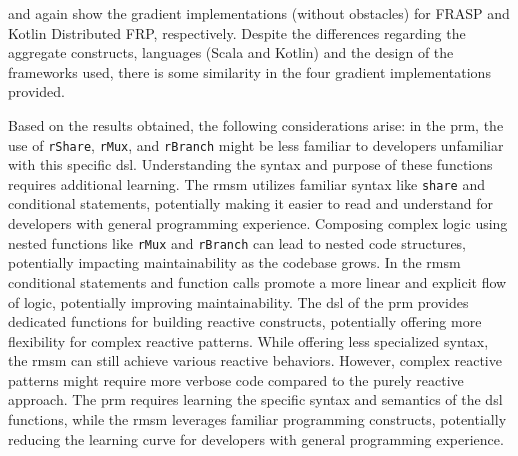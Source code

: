  and  again show the gradient implementations (without obstacles) for FRASP and Kotlin Distributed FRP, respectively. Despite the differences regarding the aggregate constructs, languages (Scala and Kotlin) and the design of the frameworks used, there is some similarity in the four gradient implementations provided.





Based on the results obtained, the following considerations arise:
in the \ac{prm}, the use of \texttt{rShare}, \texttt{rMux}, and \texttt{rBranch} might be less familiar to developers unfamiliar with this specific \ac{dsl}. Understanding the syntax and purpose of these functions requires additional learning. The \ac{rmsm} utilizes familiar syntax like \texttt{share} and conditional statements, potentially making it easier to read and understand for developers with general programming experience.
Composing complex logic using nested functions like \texttt{rMux} and \texttt{rBranch} can lead to nested code structures, potentially impacting maintainability as the codebase grows. In the \ac{rmsm} conditional statements and function calls promote a more linear and explicit flow of logic, potentially improving maintainability.
The \ac{dsl} of the \ac{prm} provides dedicated functions for building reactive constructs, potentially offering more flexibility for complex reactive patterns. While offering less specialized syntax, the \ac{rmsm} can still achieve various reactive behaviors. However, complex reactive patterns might require more verbose code compared to the purely reactive approach.
The \ac{prm} requires learning the specific syntax and semantics of the \ac{dsl} functions, while the \ac{rmsm} leverages familiar programming constructs, potentially reducing the learning curve for developers with general programming experience.

